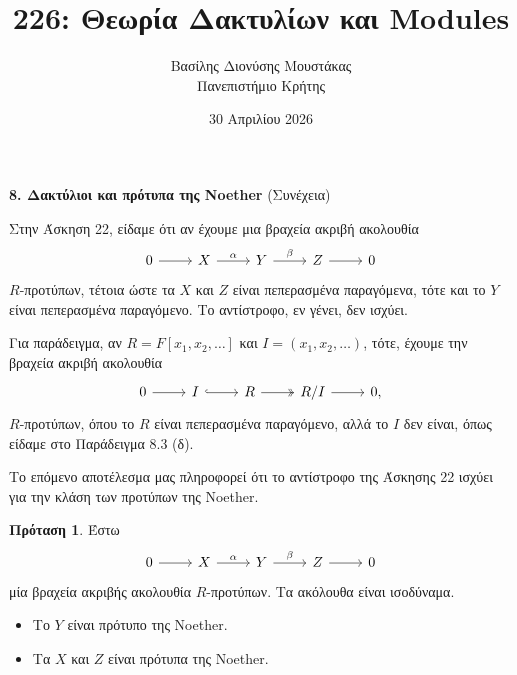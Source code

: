 \documentclass[12pt,a4paper,reqno]{amsart}
\title{226: Θεωρία Δακτυλίων και Modules}
\author[Β.~Δ. Μουστακας]{Βασίλης Διονύσης Μουστάκας \\ Πανεπιστήμιο Κρήτης}
\date{30 Απριλίου 2026}
\theoremstyle{definition}
\newtheorem{proposition}[theorem]{Πρόταση}
\theoremstyle{remark}
\numberwithin{theorem}{section}
\numberwithin{exercise}{section}
\numberwithin{equation}{section}
\begin{document}
\begingroup
\def\uppercasenonmath#1{} %
\let\MakeUppercase\relax %
\maketitle
\endgroup

\setcounter{section}{8}
\setcounter{theorem}{3}
\begin{center}
    \textbf{8. Δακτύλιοι και πρότυπα της Noether
} (Συνέχεια)
\end{center}

Στην Άσκηση 22, είδαμε ότι αν έχουμε μια βραχεία ακριβή ακολουθία 
\[
\begin{tikzcd}
    0 \arrow[r] & X \arrow[r, "\alpha"] & Y \arrow[r, "\beta"] & Z \arrow[r] & 0
\end{tikzcd}
\]
$R$-προτύπων, τέτοια ώστε τα $X$ και $Z$ είναι πεπερασμένα παραγόμενα, τότε και το $Y$ είναι πεπερασμένα παραγόμενο. Το αντίστροφο, εν γένει, δεν ισχύει.

Για παράδειγμα, αν $R = F[x_1, x_2, \dots]$ και $I = (x_1, x_2, \dots)$, τότε, έχουμε την βραχεία ακριβή ακολουθία 
\[
\begin{tikzcd}
    0 \arrow[r] & I \arrow[r, hook] & R \arrow[r, two heads] & R/I \arrow[r] & 0,
\end{tikzcd}
\]
$R$-προτύπων, όπου το $R$ είναι πεπερασμένα παραγόμενο, αλλά το $I$ δεν είναι, όπως είδαμε στο Παράδειγμα 8.3 (δ). 

Το επόμενο αποτέλεσμα μας πληροφορεί ότι το αντίστροφο της Άσκησης 22 ισχύει για την κλάση των προτύπων της Noether.
\begin{proposition}
    \label{prop:noetherian_ses}
    Έστω
    \begin{equation}
        \label{eq:ses_noether}
        \begin{tikzcd}
            0 \arrow[r] & X \arrow[r, "\alpha"] & Y \arrow[r, "\beta"] & Z \arrow[r] & 0
        \end{tikzcd}
    \end{equation}
    μία βραχεία ακριβής ακολουθία $R$-προτύπων. Τα ακόλουθα είναι ισοδύναμα.
    \begin{itemize}
        \item[(1)] Το $Y$ είναι πρότυπο της Noether.
        \item[(2)] Τα $X$ και $Z$ είναι πρότυπα της Noether.
    \end{itemize}
\end{proposition}
\end{document}
